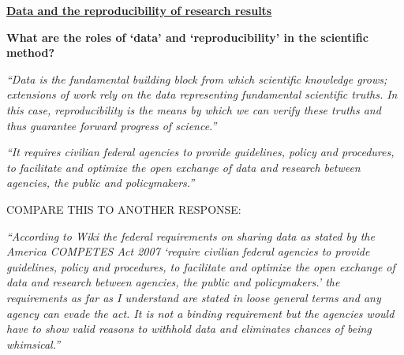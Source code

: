 \documentclass[portrait,11pt]{seminar}
\begin{document}
\bs
\underline{\bf Data and the reproducibility of research results
}

\medskip

{\bf What are the roles of `data' and `reproducibility' in the scientific method? }

{\it ``Data is the fundamental building block from which scientific knowledge grows; extensions of work rely on the data representing fundamental scientific truths. In this case, reproducibility is the means by which we can verify these truths and thus guarantee forward progress of science.''}






\es  {}

{\it ``It requires civilian federal agencies to provide guidelines, policy and procedures, to facilitate and optimize the open exchange of data and research between agencies, the public and policymakers.''}


\es

\bs
COMPARE THIS TO ANOTHER RESPONSE:

\medskip

{\it ``According to Wiki the federal requirements on sharing data as stated by the America COMPETES Act 2007 `require civilian federal agencies to provide guidelines, policy and procedures, to facilitate and optimize the open exchange of data and research between agencies, the public and policymakers.' the requirements as far as I understand are stated in loose general terms and any agency can evade the act. It is not a binding requirement but the agencies would have to show valid reasons to withhold data and eliminates chances of being whimsical.''}
\end{document}
